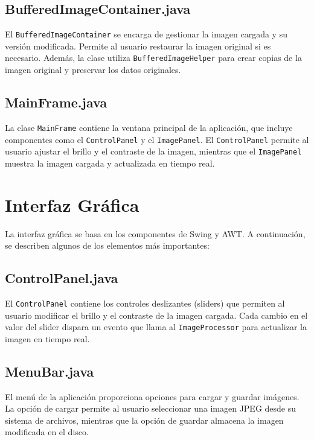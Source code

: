 \documentclass{report}
\begin{document}
  \subsection{BufferedImageContainer.java}\label{subsec:bufferedimagecontainer.java}
  El \texttt{BufferedImageContainer} se encarga de gestionar la imagen cargada y su versión modificada.
  Permite al usuario restaurar la imagen original si es necesario.
  Además, la clase utiliza \texttt{BufferedImageHelper} para crear copias de la imagen original y preservar los datos originales.

  \subsection{MainFrame.java}\label{subsec:mainframe.java}
  La clase \texttt{MainFrame} contiene la ventana principal de la aplicación, que incluye componentes como el \texttt{ControlPanel} y el \texttt{ImagePanel}.
  El \texttt{ControlPanel} permite al usuario ajustar el brillo y el contraste de la imagen, mientras que el \texttt{ImagePanel} muestra la imagen cargada y actualizada en tiempo real.


  \section{Interfaz Gráfica}\label{sec:interfaz-grafica}
  La interfaz gráfica se basa en los componentes de Swing y AWT. A continuación, se describen algunos de los elementos más importantes:

  \subsection{ControlPanel.java}\label{subsec:controlpanel.java}
  El \texttt{ControlPanel} contiene los controles deslizantes (sliders) que permiten al usuario modificar el brillo y el contraste de la imagen cargada.
  Cada cambio en el valor del slider dispara un evento que llama al \texttt{ImageProcessor} para actualizar la imagen en tiempo real.

  \subsection{MenuBar.java}\label{subsec:menubar.java}
  El menú de la aplicación proporciona opciones para cargar y guardar imágenes.
  La opción de cargar permite al usuario seleccionar una imagen JPEG desde su sistema de archivos, mientras que la opción de guardar almacena la imagen modificada en el disco.
\end{document}
